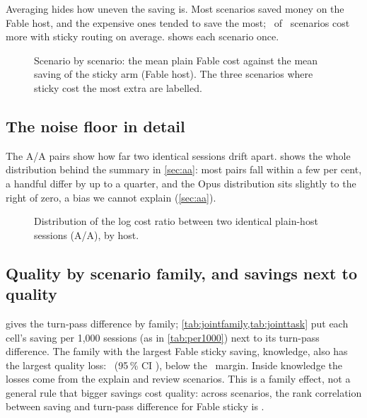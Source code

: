 Averaging hides how uneven the saving is. Most scenarios saved money on the Fable host, and the expensive ones
tended to save the most; \ScNegative\ of \ScN\ scenarios cost more with sticky routing on average.
 shows each scenario once.

\begin{figure}[htbp]
\centering
{}\par\smallskip

\caption{Scenario by scenario: the mean plain Fable cost against the mean saving of the sticky arm (Fable host). The three
scenarios where sticky cost the most extra are labelled.}
\label{fig:scenario}
\end{figure}

\FloatBarrier
\subsection{The noise floor in detail}

The A/A pairs show how far two identical sessions drift apart.  shows the whole distribution
behind the summary in \cref{sec:aa}: most pairs fall within a few per cent, a handful differ by up to a quarter, and
the Opus distribution sits slightly to the right of zero, a bias we cannot explain (\cref{sec:aa}).

\begin{figure}[htbp]
\centering
{}\par\smallskip

\caption{Distribution of the log cost ratio between two identical plain-host sessions (A/A), by host.}
\label{fig:aahist}
\end{figure}

\FloatBarrier
\subsection{Quality by scenario family, and savings next to quality}\label{sec:joint}

 gives the turn-pass difference by family; \cref{tab:jointfamily,tab:jointtask} put each
cell's saving per 1,000 sessions (as in \cref{tab:per1000}) next to its turn-pass difference. The family with the
largest Fable sticky saving, knowledge, also has the largest quality loss: \RvKnowFableSticky\ (95\,\% CI
\RvKnowFableStickyCI), below the \NIMargin\ margin. Inside knowledge the losses come from the explain and review
scenarios. This is a family effect, not a general rule that bigger savings cost quality: across scenarios, the rank
correlation between saving and turn-pass difference for Fable sticky is \RvSpearman.

